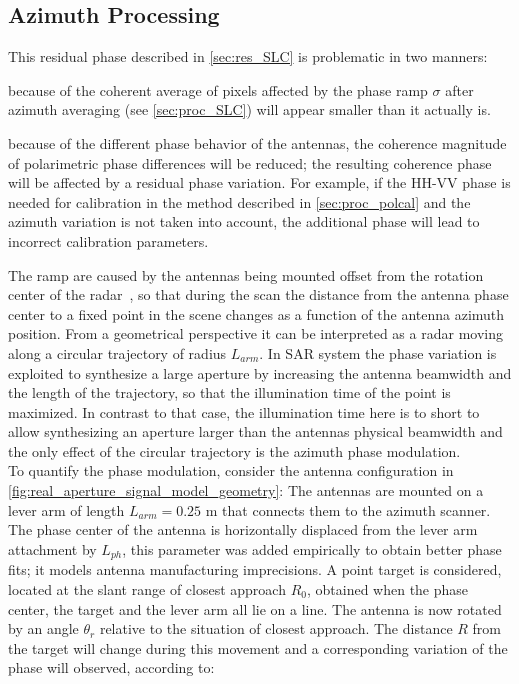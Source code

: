 \subsection{Azimuth Processing}
This residual phase described in \autoref{sec:res_SLC}  is problematic in two manners: \begin{enumerate*}
	\item because of the coherent average of pixels affected by the phase ramp\label{item:SNR}  $\sigma$ after azimuth averaging (see \autoref{sec:proc_SLC}) will appear smaller than it actually is.
  \item because of the different phase behavior of the antennas, the coherence magnitude of polarimetric phase differences will be reduced; the resulting coherence phase will be affected by a residual phase variation. For example, if the HH-VV phase is needed for calibration in the method described in \autoref{sec:proc_polcal} and the azimuth variation is not taken into account, the additional phase will lead to incorrect calibration parameters.\label{item:phase_variation}\end{enumerate*}
The ramp are caused by the antennas being mounted offset from the rotation center of the  radar~\cite{Lee2014}, so that during the scan the distance from the antenna phase center to a fixed point in the scene changes as a function of the antenna azimuth position. From a geometrical perspective it can be interpreted as a radar moving along a circular trajectory of radius $L_{arm}$. In SAR system the phase variation is exploited to synthesize a large aperture by increasing the antenna beamwidth and the length of the trajectory, so that the illumination time of the point is maximized. In contrast to that case, the illumination time here is to short to allow synthesizing an aperture larger than the antennas physical beamwidth and the only effect of the circular trajectory is the azimuth phase modulation.\\
To quantify the phase modulation, consider the antenna configuration in \autoref{fig:real_aperture_signal_model_geometry}:
The antennas are mounted on a lever arm of length $L_{arm} = 0.25$ m that connects them to the azimuth scanner. The phase center of the antenna is horizontally displaced from the lever arm attachment by $L_{ph}$, this parameter was added empirically to obtain better phase fits; it models antenna manufacturing imprecisions. A point target is considered, located at the slant range  of closest approach $R_{0}$, obtained when the phase center, the target and the lever arm all lie on a line. The antenna is now rotated by an angle $\theta_r$ relative to the situation of closest approach. The distance $R$ from the target will change during this movement and a corresponding variation of the phase will observed, according to:
